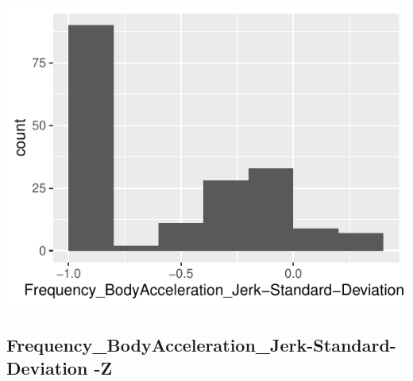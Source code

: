 \documentclass[
]{article}
\begin{document}
\begin{minipage}{0.25 \textwidth}

\includegraphics{codebook_tidydatasub_files/figure-latex/Var-56-Frequency-BodyAcceleration-Jerk-Standard-Deviation--Y-1.pdf}

\end{minipage}

\noindent\makebox[\linewidth]{\rule{\textwidth}{0.4pt}}

\hypertarget{frequency_bodyacceleration_jerk-standard-deviation--z}{%
\subsection{Frequency\_BodyAcceleration\_Jerk-Standard-Deviation
-Z}\label{frequency_bodyacceleration_jerk-standard-deviation--z}}
\end{document}
